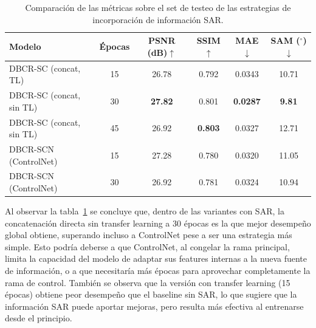 \begin{table}[H]
    \centering
 
    \begin{tabular}{lccccc}
        \hline
        \textbf{Modelo} & \textbf{Épocas} & \textbf{PSNR (dB)$\uparrow$} & \textbf{SSIM$\uparrow$} & \textbf{MAE$\downarrow$} & \textbf{SAM ($^\circ$)$\downarrow$} \\
        \hline
        DBCR-SC (concat, TL)      & 15 & 26.78 & 0.792 & 0.0343 & 10.71 \\
        DBCR-SC (concat, sin TL)  & 30 & \textbf{27.82} & 0.801 & \textbf{0.0287} & \textbf{9.81}  \\
        DBCR-SC (concat, sin TL)  & 45 & 26.92 & \textbf{0.803} & 0.0327 & 12.71  \\
        DBCR-SCN (ControlNet)     & 15 & 27.28 & 0.780 & 0.0320 & 11.05 \\
        DBCR-SCN (ControlNet)     & 30 & 26.92 & 0.781 & 0.0324 & 10.94 \\
        \hline
    \end{tabular}
    \caption{Comparación de las métricas sobre el set de testeo de las estrategias de incorporación de información SAR.}
    \label{tab:sar_strategies}

\end{table}


Al observar la tabla~\ref{tab:sar_strategies} se concluye que, dentro de las variantes con SAR, la concatenación directa sin transfer learning a 30 épocas es la que mejor desempeño global obtiene, superando incluso a ControlNet pese a ser una estrategia más simple. Esto podría deberse a que ControlNet, al congelar la rama principal, limita la capacidad del modelo de adaptar sus features internas a la nueva fuente de información, o a que necesitaría más épocas para aprovechar completamente la rama de control. También se observa que la versión con transfer learning (15 épocas) obtiene peor desempeño que el baseline sin SAR, lo que sugiere que la información SAR puede aportar mejoras, pero resulta más efectiva al entrenarse desde el principio.

